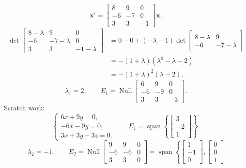 \begin{example}
  \[
    \mathbf{x}'=
    \begin{bmatrix}
      8 & 9 & 0 \\-6&-7&0\\3&3&-1
    \end{bmatrix}
    \mathbf{x}.
  \]
  \begin{align*}
    \det
    \begin{bmatrix}
      8-\lambda & 9 & 0 \\-6&-7-\lambda&0\\3&3&-1-\lambda
    \end{bmatrix}
     & =0-0+(-\lambda-1)\det
    \begin{bmatrix}
      8-\lambda & 9 \\-6&-7-\lambda
    \end{bmatrix}
    \\
     & =-(1+\lambda)(\lambda^2-\lambda-2) \\
     & =-(1+\lambda)^2(\lambda-2).
  \end{align*}
  \[
    \lambda_1=2,\qquad
    E_1=\operatorname{Null}
    \begin{bmatrix}
      6 & 9 & 0 \\-6&-9&0\\3&3&-3
    \end{bmatrix}
    .
  \]
  Scratch work:
  \[
    \begin{cases}
      6x+9y=0,  \\
      -6x-9y=0, \\
      3x+3y-3z=0.
    \end{cases}
    \qquad E_1=\operatorname{span}\left\{
    \begin{bmatrix}
      3 \\-2\\1
    \end{bmatrix}
    \right\}.
  \]
  \[
    \lambda_2=-1,\qquad
    E_2=\operatorname{Null}
    \begin{bmatrix}
      9 & 9 & 0 \\-6&-6&0\\3&3&0
    \end{bmatrix}
    =\operatorname{span}\left\{
    \begin{bmatrix}
      1 \\-1\\0
    \end{bmatrix}
    ,
    \begin{bmatrix}
      0 \\0\\1

\end{bmatrix}\]
\end{example}
